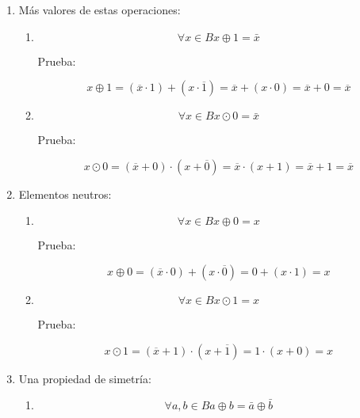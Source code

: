 \begin{enumerate}
\begin{enumerate}
\begin{enumerate}
\begin{enumerate}
        Prueba:

        \[x \odot {{{{\overline{x} = {{({x + \overline{\overline{x}}})} \cdot {({\overline{x} + \overline{x}})}}} = {({{({x + x})} \cdot \overline{x}})}} = {x \cdot \overline{x}}} = 0}\]
      \end{enumerate}
    \item
      Más valores de estas operaciones:

      \begin{enumerate}
      \def\labelenumiv{\arabic{enumiv}.}
      \item
        \[\forall{x \in B}x \oplus {1 = \bar{x}}\]

        Prueba:

        \[x \oplus {{{{1 = {{({\overline{x} \cdot 1})} + {({x \cdot \overline{1}})}}} = {\overline{x} + {({x \cdot 0})}}} = {\overline{x} + 0}} = \overline{x}}\]
      \item
        \[\forall{x \in B}x \odot {0 = \bar{x}}\]

        Prueba:

        \[x \odot {{{{0 = {{({\overline{x} + 0})} \cdot {({x + \overline{0}})}}} = {\overline{x} \cdot {({x + 1})}}} = {\overline{x} + 1}} = \overline{x}}\]
      \end{enumerate}
    \item
      Elementos neutros:

      \begin{enumerate}
      \def\labelenumiv{\arabic{enumiv}.}
      \item
        \[\forall{x \in B}x \oplus {0 = x}\]

        Prueba:

        \[x \oplus {{{0 = {{({\overline{x} \cdot 0})} + {({x \cdot \overline{0}})}}} = {0 + {({x \cdot 1})}}} = x}\]
      \item
        \[\forall{x \in B}x \odot {1 = x}\]

        Prueba:

        \[x \odot {{{1 = {{({\overline{x} + 1})} \cdot {({x + \overline{1}})}}} = {1 \cdot {({x + 0})}}} = x}\]
      \end{enumerate}
    \item
      Una propiedad de simetría:

      \begin{enumerate}
      \def\labelenumiv{\arabic{enumiv}.}
      \item
        \[\forall a,{b \in B}a \oplus {b = \bar{a}} \oplus \bar{b}\]


\end{enumerate}
\end{enumerate}
\end{enumerate}
\end{enumerate}
